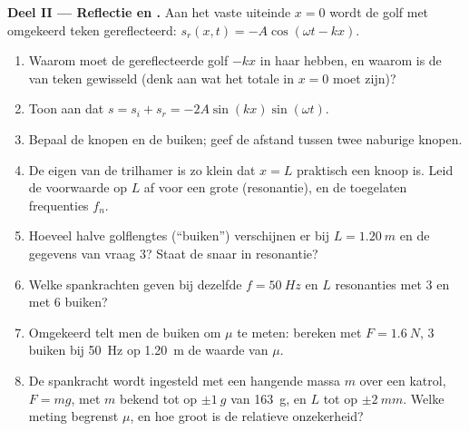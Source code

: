 \begin{problem}
\medskip
\noindent\textbf{Deel II --- Reflectie en .}
Aan het vaste uiteinde $x = 0$ wordt de golf met omgekeerd teken gereflecteerd:
$s_r(x, t) = -A\cos(\omega t - kx)$.
\begin{enumerate}[resume]
  \item Waarom moet de gereflecteerde golf $-kx$ in haar  hebben, en waarom
        is de  van teken gewisseld (denk aan wat het totale 
        in $x = 0$ moet zijn)?
  \item Toon aan dat $s = s_i + s_r = -2A\sin(kx)\sin(\omega t)$.
  \item Bepaal de knopen en de buiken; geef de afstand tussen twee
        naburige knopen.
  \item De eigen  van de trilhamer is zo klein dat $x = L$
        praktisch een knoop is. Leid de voorwaarde op $L$ af voor een grote
         (resonantie), en de toegelaten frequenties $f_n$.
  \item Hoeveel halve golflengtes (``buiken'') verschijnen er bij
        $L = \qty{1.20}{m}$ en de gegevens van vraag 3? Staat de snaar in
        resonantie?
  \item Welke spankrachten geven bij dezelfde $f = \qty{50}{Hz}$ en $L$
        resonanties met $3$ en met $6$ buiken?
  \item Omgekeerd telt men de buiken om $\mu$ te meten: bereken met
        $F = \qty{1.6}{N}$, $3$ buiken bij \qty{50}{Hz} op \qty{1.20}{m}
        de waarde van $\mu$.
  \item De spankracht wordt ingesteld met een hangende massa $m$ over een
        katrol, $F = mg$, met $m$ bekend tot op $\pm\qty{1}{g}$ van \qty{163}{g}, en
        $L$ tot op $\pm\qty{2}{mm}$. Welke meting begrenst $\mu$, en
        hoe groot is de relatieve onzekerheid?
\end{enumerate}


\end{problem}
